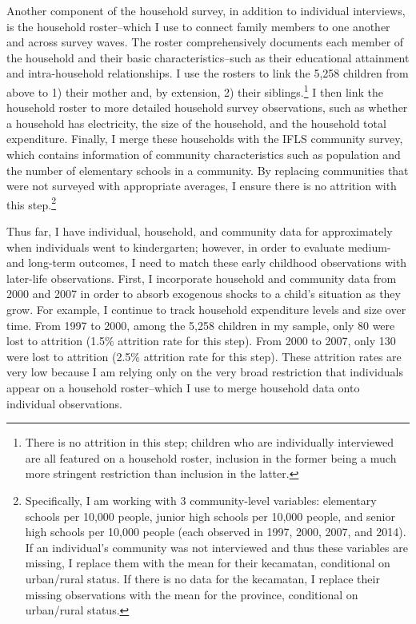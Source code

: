 Another component of the household survey, in addition to individual interviews, is the household roster--which I use to connect family members to one another and across survey waves. The roster comprehensively documents each member of the household and their basic characteristics--such as their educational attainment and intra-household relationships. I use the rosters to link the 5,258 children from above to 1) their mother and, by extension, 2) their siblings.\footnote{ There is no attrition in this step; children who are individually interviewed are all featured on a household roster, inclusion in the former being a much more stringent restriction than inclusion in the latter.} I then link the household roster to more detailed household survey observations, such as whether a household has electricity, the size of the household, and the household total expenditure. Finally, I merge these households with the IFLS community survey, which contains information of community characteristics such as population and the number of elementary schools in a community. By replacing communities that were not surveyed with appropriate averages, I ensure there is no attrition with this step.\footnote{ Specifically, I am working with 3 community-level variables: elementary schools per 10,000 people, junior high schools per 10,000 people, and senior high schools per 10,000 people (each observed in 1997, 2000, 2007, and 2014). If an individual's community was not interviewed and thus these variables are missing, I replace them with the mean for their kecamatan, conditional on urban/rural status. If there is no data for the kecamatan, I replace their missing observations with the mean for the province, conditional on urban/rural status.}

Thus far, I have individual, household, and community data for approximately when individuals went to kindergarten; however, in order to evaluate medium- and long-term outcomes, I need to match these early childhood observations with later-life observations. First, I incorporate household and community data from 2000 and 2007 in order to absorb exogenous shocks to a child's situation as they grow. For example, I continue to track household expenditure levels and size over time. From 1997 to 2000, among the 5,258 children in my sample, only 80 were lost to attrition (1.5\% attrition rate for this step). From 2000 to 2007, only 130 were lost to attrition (2.5\% attrition rate for this step). These attrition rates are very low because I am relying only on the very broad restriction that individuals appear on a household roster--which I use to merge household data onto individual observations.

